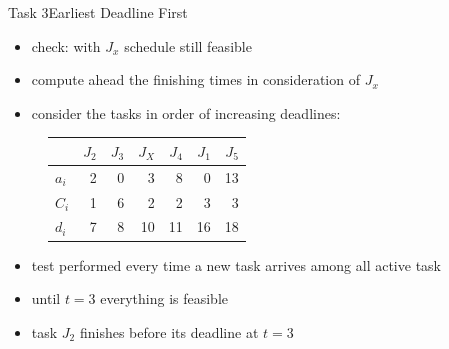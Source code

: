 \begin{frame}[allowframebreaks]{Task 3}{Earliest Deadline First\vspace{0.5cm}}
  \begin{itemize}
    \item \alert{check:} with $J_x$ schedule \alert{still feasible}
    \item compute \alert{ahead} the \alert{finishing times} in consideration of $J_x$
    \item consider the tasks \alert{in order of increasing deadlines:}
  \end{itemize}
  \begin{figure}
  \centering
  \begin{tabular}{|l|r|r|r|r|r|r|}
    \hline             & $J_2$ & $J_3$ & $J_X$ & $J_4$ & $J_1$ & $J_5$ \\
    \hline \hline$a_i$ & 2     & 0     & 3     & 8     & 0     & 13 \\
    \hline$C_i$        & 1     & 6     & 2     & 2     & 3     & 3 \\
    \hline$d_i$        & 7     & 8     & 10    & 11    & 16    & 18 \\
    \hline
  \end{tabular}
  \end{figure}
  \begin{itemize}
    \item test performed every time a new \alert{task arrives} among \alert{all active task}
  \item until $t=3$ \alert{everything is feasible}
  \item task $J_2$ finishes before its deadline at $t = 3$

\end{itemize}
\end{frame}
